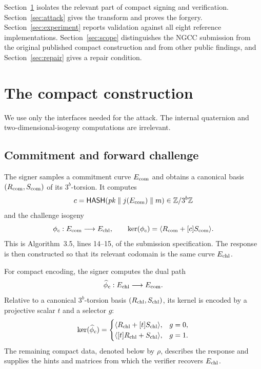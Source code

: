 \documentclass[11pt,a4paper]{article}
\newcommand{\Hash}{\mathsf{HASH}}
\begin{document}
Section~\ref{sec:construction} isolates the relevant part of compact signing and verification.
Section~\ref{sec:attack} gives the transform and proves the forgery.  Section~\ref{sec:experiment}
reports validation against all eight reference implementations.  Section~\ref{sec:scope}
distinguishes the NGCC submission from the original published compact construction and from
other public findings, and
Section~\ref{sec:repair} gives a repair condition.

\section{The compact construction}
\label{sec:construction}

We use only the interfaces needed for the attack.  The internal quaternion and
two-dimensional-isogeny computations are irrelevant.

\subsection{Commitment and forward challenge}

The signer samples a commitment curve $E_{\rm com}$ and obtains a canonical basis
$(R_{\rm com},S_{\rm com})$ of its $3^b$-torsion.  It computes
\begin{equation}
  c=\Hash(\mathit{pk}\parallel j(E_{\rm com})\parallel m)
     \in \mathbb Z/3^b\mathbb Z                                      \label{eq:hash}
\end{equation}
and the challenge isogeny
\begin{equation}
  \phi_c:E_{\rm com}\longrightarrow E_{\rm chl},\qquad
  \ker(\phi_c)=\langle R_{\rm com}+[c]S_{\rm com}\rangle .          \label{eq:forward}
\end{equation}
This is Algorithm~3.5, lines 14--15, of the submission specification.  The response is then
constructed so that its relevant codomain is the same curve $E_{\rm chl}$.

For compact encoding, the signer computes the dual path
\begin{equation}
  \widehat\phi_c:E_{\rm chl}\longrightarrow E_{\rm com}.             \label{eq:dual}
\end{equation}
Relative to a canonical $3^b$-torsion basis $(R_{\rm chl},S_{\rm chl})$, its kernel is encoded
by a projective scalar $t$ and a selector $g$:
\[
  \ker(\widehat\phi_c)=
  \begin{cases}
    \langle R_{\rm chl}+[t]S_{\rm chl}\rangle,&g=0,\\
    \langle [t]R_{\rm chl}+S_{\rm chl}\rangle,&g=1.
  \end{cases}
\]
The remaining compact data, denoted below by $\rho$, describes the response and supplies the
hints and matrices from which the verifier recovers $E_{\rm chl}$.
\end{document}
